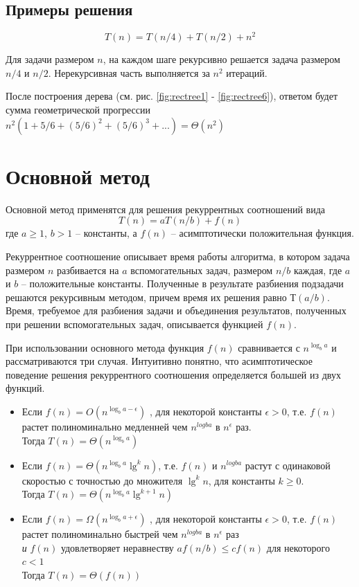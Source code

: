 \documentclass[11pt]{article}
\begin{document}
\subsection{Примеры решения}
\begin{equation*}
  T(n) = T(n/4) + T(n/2) + n^2 
\end{equation*}

Для задачи размером $n$, на каждом шаге рекурсивно решается задача размером $n/4$ и $n/2$. Нерекурсивная часть выполняется за $n^2$ итераций.

После построения дерева (см. рис. \ref{fig:rectree1} - \ref{fig:rectree6}), ответом будет сумма геометрической прогрессии $n^2(1+5/6 + (5/6)^2 + (5/6)^3 + ...) = \Theta(n^2)$

\section{Основной метод}

Основной метод применятся для решения рекуррентных соотношений вида
\begin{equation*}
T(n) = aT(n/b) + f(n)
\end{equation*}
где $a \geqslant 1$, $b > 1$ -- константы, а $f(n)$ -- асимптотически положительная функция.

Рекуррентное соотношение описывает время работы алгоритма, в котором задача размером $n$
разбивается на $a$ вспомогательных задач, размером $n/b$ каждая, где $a$ и $b$ -- положительные константы.
Полученные в результате разбиения подзадачи решаются рекурсивным методом, причем время их решения
равно $Т(a/b)$. Время, требуемое для разбиения задачи и объединения результатов, полученных при
решении вспомогательных задач, описывается функцией $f(n)$.

При использовании основного метода функция $f(n)$ сравнивается с $n^{\log_b a}$ и рассматриваются три случая. Интуитивно понятно, что асимптотическое поведение решения рекуррентного соотношения определяется большей из двух функций.

\begin{itemize}
\item Если $f(n) = O(n^{\log_{b}{a - \epsilon}})$ , для некоторой константы $\epsilon > 0$, т.е. $f(n)$ растет полиноминально медленней чем $n^{log{b}{a}}$ в $n^\epsilon$ раз.\\
Тогда $T(n) = \Theta(n^{\log_b a})$

\item Если $f(n) = \Theta(n^{\log_{b}{a}}\lg^k n)$, т.е. $f(n)$ и $n^{log{b}{a}}$ растут с одинаковой скоростью с точностью до множителя $\lg^k n$, для константы $k \geqslant 0$.\\
Тогда $T(n) = \Theta(n^{\log_b a}\lg^{k+1} n)$

\item Если $f(n) = \Omega(n^{\log_{b}{a + \epsilon}})$ , для некоторой константы $\epsilon > 0$, т.е. $f(n)$ растет полиноминально быстрей чем $n^{log{b}{a}}$ в $n^\epsilon$ раз \\
\emph{и} $f(n)$ удовлетворяет неравнеству $a f(n/b) \leqslant c f(n)$ для некоторого $c < 1$\\
Тогда $T(n) = \Theta(f(n))$
\end{itemize}
\end{document}

